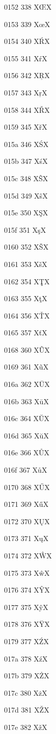 \documentclass[11pt]{article}
\begin{document}
0152 338 X{\OE}X

0153 339 X{\oe}X

0154 340 X{\'R}X

0155 341 X{\'r}X

0156 342 X{\c{R}}X

0157 343 X{\c{r}}X

0158 344 X{\v{R}}X

0159 345 X{\v{r}}X

015a 346 X{\'S}X

015b 347 X{\'s}X

015c 348 X{\^S}X

015d 349 X{\^s}X

015e 350 X{\c{S}}X

015f 351 X{\c{s}}X

0160 352 X{\v{S}}X

0161 353 X{\v{s}}X

0162 354 X{\c{T}}X

0163 355 X{\c{t}}X

0164 356 X{\v{T}}X

0165 357 X{\v{t}}X

0168 360 X{\~U}X

0169 361 X{\~u}X

016a 362 X{\=U}X

016b 363 X{\=u}X

016c 364 X{\u{U}}X

016d 365 X{\u{u}}X

016e 366 X{\r{U}}X

016f 367 X{\r{u}}X

0170 368 X{\H{U}}X

0171 369 X{\H{u}}X

0172 370 X{\k{U}}X

0173 371 X{\k{u}}X

0174 372 X{\^W}X

0175 373 X{\^w}X

0176 374 X{\^Y}X

0177 375 X{\^y}X

0178 376 X{\"Y}X

0179 377 X{\'Z}X

017a 378 X{\'z}X

017b 379 X{\.Z}X

017c 380 X{\.z}X

017d 381 X{\v{Z}}X

017e 382 X{\v{z}}X

%
%
%
%
%
%
%
%
%
%
%
%
%
%
%
%
%
%
%
%
%
%
%
%
\end{document}
